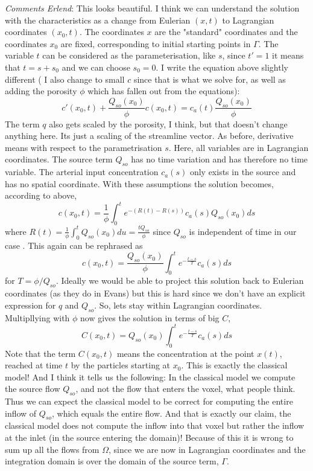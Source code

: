\documentclass[paper=a4, fontsize=12pt,parskip=half,draft,headings=small]{scrartcl}
\begin{document}
		\textit{Comments Erlend}: This looks beautiful. I think we can understand the solution with the characteristics as a change from Eulerian $(x,t)$ to Lagrangian coordinates $(x_0,t)$. The coordinates $x$ are the "standard" coordinates and the coordinates $x_0$ are fixed, corresponding to initial starting points in $\Gamma$. The variable $t$ can be considered as the parameterisation, like $s$, since $t' = 1$ it means that $t  = s + s_0$ and we can choose $s_0 = 0$. I write the equation above slightly different ( I also change to small $c$ since that is what we solve for, as well as adding the porosity $\phi$ which has fallen out from the equations):
		$$
		c'(x_0,t) + \frac{Q_{so}(x_0)}{\phi}c(x_0,t) = c_a(t)\frac{Q_{so}(x_0)}{\phi}
		$$
		The term $q$ also gets scaled by the porosity, I think, but that doesn't change anything here. Its just a scaling of the streamline vector.
		As before, derivative means with respect to the parametrisation $s$. Here, all variables are in Lagrangian coordinates. The source term $Q_{so}$ has no time variation and has therefore no time variable. The arterial input concentration $c_a(s)$ only exists in the source and has no spatial coordinate. With these assumptions the solution becomes, according to above,
		$$
		c(x_0,t) = \frac{1}{\phi}\int_0^{t}e^{-(R(t) - R(s))}c_a(s)Q_{so}(x_0)ds
		$$
		where $R(t) = \frac{1}{\phi}\int_0^t Q_{so}(x_0)du = \frac{tQ_{so}}{\phi}$ since $Q_{so}$ is independent of time in our case . This again can be rephrased as
		$$
		c(x_0,t) = \frac{Q_{so}(x_0)}{\phi}\int_0^{t}e^{-\frac{t-s}{T}}c_a(s)ds
		$$
		for $T = \phi/Q_{so}$. Ideally we would be able to project this solution back to Eulerian coordinates (as they do in Evans) but this is hard since we don't have an explicit expression for $q$ and $Q_{so}$. So, lets stay within Lagrangian coordinates. Multipllying with $\phi$ now gives the solution in terms of big $C$,
		$$
		C(x_0,t) = Q_{so}(x_0)\int_0^{t}e^{-\frac{t-s}{T}}c_a(s)ds
		$$
		Note that the term $C(x_0,t)$ means the concentration at the point $x(t)$, reached at time $t$ by the particles starting at $x_0$.
		This is exactly the classical model! And I think it tells us the following: In the classical model we compute the source flow $Q_{so}$, and not the flow that enters the voxel, what people think. Thus we can expect the classical model to be correct for computing the entire inflow of $Q_{so}$, which equals the entire flow. And that is exactly our claim, the classical model does not compute the inflow into that voxel but rather the inflow at the inlet (in the source entering the domain)! Because of this it is wrong to sum up all the flows from $\Omega$, since we are now in Lagrangian coordinates and the integration domain is over the domain of the source term, $\Gamma$.
\end{document}
